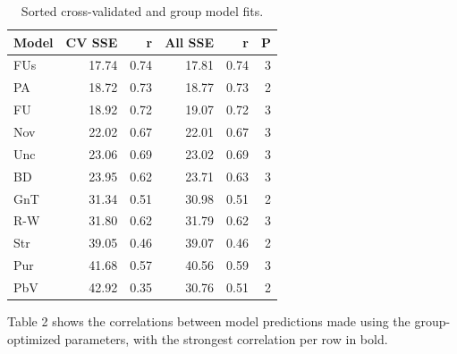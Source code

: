 \documentclass[10pt, letterpaper]{article}
\begin{document}
\begin{table}[H]
\centering
\begin{tabular}{lrrrrr}
  \hline
Model & CV SSE &  r & All SSE & r & P \\ 
  \hline
FUs & 17.74 & 0.74 & 17.81 & 0.74 & 3 \\ 
  PA & 18.72 & 0.73 & 18.77 & 0.73 & 2 \\ 
  FU & 18.92 & 0.72 & 19.07 & 0.72 & 3 \\ 
  Nov & 22.02 & 0.67 & 22.01 & 0.67 & 3 \\ 
  Unc & 23.06 & 0.69 & 23.02 & 0.69 & 3 \\ 
  BD & 23.95 & 0.62 & 23.71 & 0.63 & 3 \\ 
  GnT & 31.34 & 0.51 & 30.98 & 0.51 & 2 \\ 
  R-W & 31.80 & 0.62 & 31.79 & 0.62 & 3 \\ 
  Str & 39.05 & 0.46 & 39.07 & 0.46 & 2 \\ 
  Pur & 41.68 & 0.57 & 40.56 & 0.59 & 3 \\ 
  PbV & 42.92 & 0.35 & 30.76 & 0.51 & 2 \\ 
   \hline
\end{tabular}
\caption{Sorted cross-validated and group model fits.} 
\end{table}

Table 2 shows the correlations between model predictions made using the
group-optimized parameters, with the strongest correlation per row in
bold.
\end{document}
